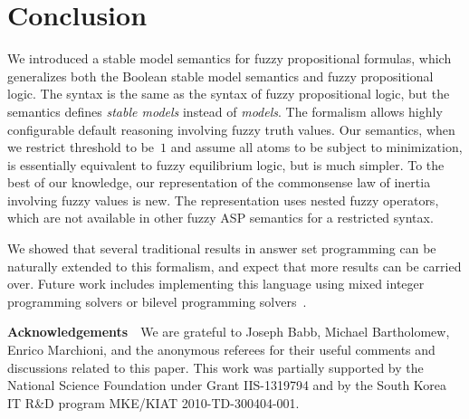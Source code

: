 \documentclass[runningheads]{llncs}
\begin{document}
\section{Conclusion} \label{sec:conclusion} 


We introduced a stable model semantics for fuzzy propositional
formulas, which generalizes both the Boolean stable model semantics
and fuzzy propositional logic. The syntax is the same as the syntax of
fuzzy propositional logic, but the semantics defines {\em stable
  models} instead of {\em models}. The formalism allows highly
configurable default reasoning involving fuzzy truth values. 
Our semantics, when we restrict threshold to be~$1$ and assume all
atoms to be subject to minimization, is essentially equivalent to
fuzzy equilibrium logic, but is much simpler. To the best of our
knowledge, our representation of the commonsense law of inertia involving
fuzzy values is new. The representation uses nested fuzzy operators,
which are not available in other fuzzy ASP semantics for a restricted syntax.

We showed that several traditional results in answer set programming can be naturally extended to this formalism, and expect that more results can be carried over. 
Future work includes
implementing this language using mixed integer programming solvers or
bilevel programming solvers~\cite{alviano13fuzzy}. 


\smallskip\noindent
{\bf Acknowledgements}\ \ 
We are grateful to Joseph Babb, Michael Bartholomew, Enrico Marchioni, and the anonymous
referees for their useful comments and discussions related to this paper. 
This work was partially supported by the National Science Foundation under Grant IIS-1319794 and by the South Korea IT R\&D program MKE/KIAT
2010-TD-300404-001.

%

%
\end{document}
